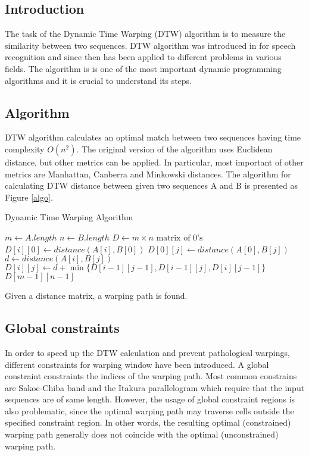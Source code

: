 \documentclass{article}
\date{\today}
\begin{document}
	\subsection*{Introduction}
	The task of the Dynamic Time Warping (DTW) algorithm is to measure the similarity between two sequences. DTW algorithm was introduced in \cite{Sakoe:1990:DPA:108235.108244} for speech recognition and since then has been applied to different problems in various fields. The algorithm is is one of the most important dynamic programming algorithms and it is crucial to understand its steps.
	
	\subsection*{Algorithm}
	
	DTW algorithm calculates an optimal match between two sequences having time complexity $O(n^2)$. The original version of the algorithm uses Euclidean distance, but other metrics can be applied. In particular, most important of other metrics are Manhattan, Canberra and Minkowski distances. The algorithm for calculating DTW distance between given two sequences A and B is presented as Figure \ref{algo}. 
	
	\begin{algorithm}
		\caption{Dynamic Time Warping Algorithm}\label{algo}
		\begin{algorithmic}[1]
			\State $m \gets A.length$
			\State $n \gets B.length$
			\State $D \gets m \times n \text{ matrix of } 0\text{'s}$
			\State $D[i][0] \gets distance(A[i], B[0])$
			\EndFor		
			\State $D[0][j] \gets distance(A[0], B[j])$
			\EndFor
				\State $d \gets distance(A[i], B[j])$
				\State $D[i][j] \gets d + \min\{D[i-1][j-1], D[i-1][j], D[i][j-1]\}$
			\EndFor
			\EndFor
			\Return $D[m-1][n-1]$
			\EndFunction
		\end{algorithmic}
		\end{algorithm}

		Given a distance matrix, a warping path is found. 
		
	\subsection*{Global constraints}
	In order to speed up the DTW calculation and prevent pathological warpings, different constraints for warping window have been introduced. 
	A global constraint constraints the indices of the warping path.
	 Most common constrains are Sakoe-Chiba band and the Itakura parallelogram which require that the input sequences are of same length.
	However, the usage of global constraint regions is also problematic, since the optimal warping path may traverse cells outside the specified constraint region. In other words, the resulting optimal (constrained) warping path generally does not coincide with the optimal (unconstrained) warping path.
	
\end{document}
